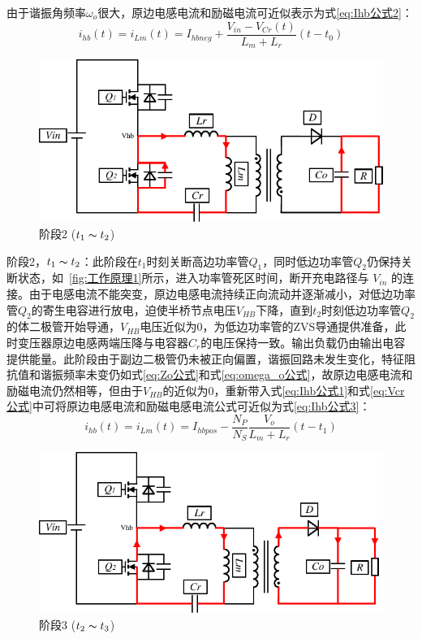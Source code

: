 由于谐振角频率$\omega_o$很大，原边电感电流和励磁电流可近似表示为式\eqref{eq:Ihb公式2}：
\begin{equation}
    \label{eq:Ihb公式2}
    i_{hb}(t) = i_{Lm}(t) = I_{hbneg} + \frac{V_{in}-V_{Cr}(t)}{L_m + L_r}(t-t_0)
\end{equation}


\begin{figure}[htbp] 
    \centering
    \includegraphics[width=0.6\linewidth]{figures/工作原理2.pdf}
    \caption{阶段2 ($t_1 \thicksim t_2$)}
    \label{fig:工作原理2}
\end{figure}
                
阶段2，$t_1 \thicksim t_2$：此阶段在$t_1$时刻关断高边功率管$Q_1$，同时低边功率管$Q_2$仍保持关断状态，如~\ref{fig:工作原理1}所示，进入功率管死区时间，断开充电路径与 $V_{in}$ 的连接。由于电感电流不能突变，原边电感电流持续正向流动并逐渐减小，对低边功率管$Q_2$的寄生电容进行放电，迫使半桥节点电压$V_{HB}$下降，直到$t_2$时刻低边功率管$Q_2$的体二极管开始导通，$V_{HB}$电压近似为0，为低边功率管的ZVS导通提供准备，此时变压器原边电感两端压降与电容器$C_r$的电压保持一致。输出负载仍由输出电容提供能量。此阶段由于副边二极管仍未被正向偏置，谐振回路未发生变化，特征阻抗值和谐振频率未变仍如式\eqref{eq:Zo公式}和式\eqref{eq:omega_o公式}，故原边电感电流和励磁电流仍然相等，但由于$V_{HB}$的近似为0，重新带入式\eqref{eq:Ihb公式1}和式\eqref{eq:Vcr公式}中可将原边电感电流和励磁电感电流公式可近似为式\eqref{eq:Ihb公式3}：
\begin{equation}
    \label{eq:Ihb公式3}
    i_{hb}(t) = i_{Lm}(t) = I_{hbpos} - \frac{N_P}{N_S} \frac{V_o}{L_m + L_r}(t-t_1)
\end{equation}

                
\begin{figure}[htbp] 
    \centering
    \includegraphics[width=0.6\linewidth]{figures/工作原理3.pdf}
    \caption{阶段3 ($t_2 \thicksim t_3$)}
    \label{fig:工作原理3}
\end{figure}

